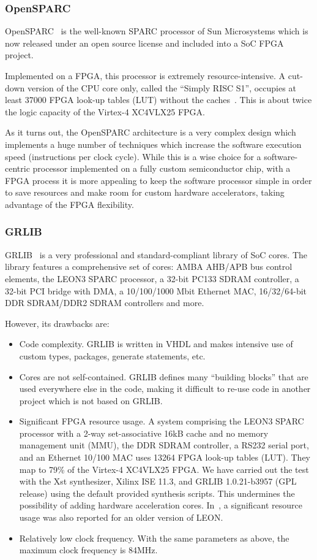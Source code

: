 \documentclass[a4paper,11pt]{kthesis}
\begin{document}
\subsubsection{OpenSPARC}
OpenSPARC~\cite{opensparc} is the well-known SPARC processor of Sun Microsystems which is now released under an open source license and included into a SoC FPGA project.

Implemented on a FPGA, this processor is extremely resource-intensive. A cut-down version of the CPU core only, called the ``Simply RISC S1'', occupies at least 37000 FPGA look-up tables (LUT) without the caches~\cite{simplyrisc}. This is about twice the logic capacity of the Virtex-4 XC4VLX25 FPGA.

As it turns out, the OpenSPARC architecture is a very complex design which implements a huge number of techniques which increase the software execution speed (instructions per clock cycle). While this is a wise choice for a software-centric processor implemented on a fully custom semiconductor chip, with a FPGA process it is more appealing to keep the software processor simple in order to save resources and make room for custom hardware accelerators, taking advantage of the FPGA flexibility.

\subsubsection{GRLIB}
GRLIB~\cite{grlib} is a very professional and standard-compliant library of SoC cores. The library features a comprehensive set of cores: AMBA AHB/APB bus control elements, the LEON3 SPARC processor, a 32-bit PC133 SDRAM controller, a 32-bit PCI bridge with DMA, a 10/100/1000 Mbit Ethernet MAC,  16/32/64-bit DDR SDRAM/DDR2 SDRAM controllers and more.

However, its drawbacks are:
\begin{itemize}
\item Code complexity. GRLIB is written in VHDL and makes intensive use of custom types, packages, generate statements, etc.
\item Cores are not self-contained. GRLIB defines many ``building blocks'' that are used everywhere else in the code, making it difficult to re-use code in another project which is not based on GRLIB.
\item Significant FPGA resource usage. A system comprising the LEON3 SPARC processor with a 2-way set-associative 16kB cache and no memory management unit (MMU), the DDR SDRAM controller, a RS232 serial port, and an Ethernet 10/100 MAC uses 13264 FPGA look-up tables (LUT). They map to 79\% of the Virtex-4 XC4VLX25 FPGA. We have carried out the test with the Xst synthesizer, Xilinx ISE 11.3, and GRLIB 1.0.21-b3957 (GPL release) using the default provided synthesis scripts. This undermines the possibility of adding hardware acceleration cores. In~\cite{softcorecomp}, a significant resource usage was also reported for an older version of LEON.
\item Relatively low clock frequency. With the same parameters as above, the maximum clock frequency is 84MHz.
\end{itemize}
\end{document}
